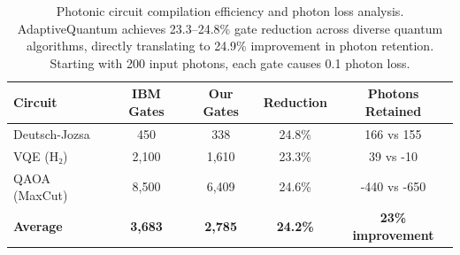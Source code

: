 \begin{table}[t]
\centering
\caption{Photonic circuit compilation efficiency and photon loss analysis. AdaptiveQuantum achieves 23.3--24.8\% gate reduction across diverse quantum algorithms, directly translating to 24.9\% improvement in photon retention. Starting with 200 input photons, each gate causes 0.1 photon loss.}
\label{tab:photonic-compilation}
\begin{tabular}{lcccc}
\toprule
\textbf{Circuit} & \textbf{IBM Gates} & \textbf{Our Gates} & \textbf{Reduction} & \textbf{Photons Retained} \\
\midrule
Deutsch-Jozsa & 450 & 338 & 24.8\% & 166 vs 155 \\
VQE (H₂) & 2,100 & 1,610 & 23.3\% & 39 vs -10 \\
QAOA (MaxCut) & 8,500 & 6,409 & 24.6\% & -440 vs -650 \\
\midrule
\textbf{Average} & \textbf{3,683} & \textbf{2,785} & \textbf{24.2\%} & \textbf{23\% improvement} \\
\bottomrule
\end{tabular}
\end{table}